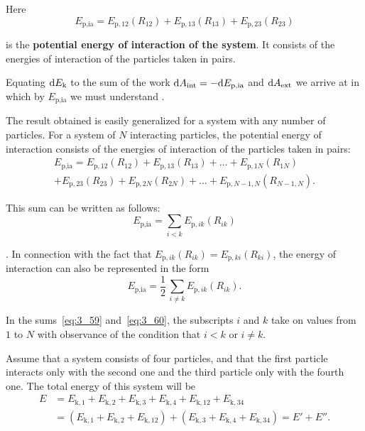 \noindent
Here
\begin{equation}\label{eq:3_57}
E_{\text{p,ia}} = E_{\text{p},12}(R_{12}) + E_{\text{p},13}(R_{13}) + E_{\text{p},23}(R_{23})
\end{equation}

\noindent
is the \textbf{potential energy of interaction of the system}. It consists of the energies of interaction of the particles taken in pairs.

Equating $\mathrm{d} E_{\text{k}}$ to the sum of the work $\mathrm{d} A_{\text{int}}=-\mathrm{d} E_{\text{p,ia}}$ and $\mathrm{d} A_{\text{ext}}$ we arrive at  in which by $E_{\text{p,ia}}$ we must understand .

The result obtained is easily generalized for a system with any number of particles. For a system of $N$ interacting particles, the potential energy of interaction consists of the energies of interaction of the particles taken in pairs:
\begin{multline}\label{eq:3_58}
E_{\text{p,ia}} = E_{\text{p},12}(R_{12}) + E_{\text{p},13}(R_{13}) + \ldots + E_{\text{p},1N}(R_{1N})\\
+ E_{\text{p},23}(R_{23}) + E_{\text{p},2N}(R_{2N}) + \ldots + E_{\text{p},N-1,N}(R_{N-1,N}).
\end{multline}

\noindent
This sum can be written as follows:
\begin{equation}\label{eq:3_59}
E_{\text{p,ia}} = \sum_{i<k} E_{\text{p},ik}(R_{ik})
\end{equation}

. In connection with the fact that $E_{\text{p},ik}(R_{ik})=E_{\text{p},ki}(R_{ki})$, the energy of interaction can also be represented in the form
\begin{equation}\label{eq:3_60}
E_{\text{p,ia}} = \frac{1}{2}\,\sum_{i\neq k} E_{\text{p},ik}(R_{ik}).
\end{equation}

\noindent
In the sums~\eqref{eq:3_59} and~\eqref{eq:3_60}, the subscripts $i$ and $k$ take on values from $1$ to $N$ with observance of the condition that $i<k$ or $i\neq k$.

Assume that a system consists of four particles, and that the first particle interacts only with the second one and the third particle only with the fourth one. The total energy of this system will be
\begin{align}
E &= E_{\text{k},1} + E_{\text{k},2} + E_{\text{k},3} + E_{\text{k},4} + E_{\text{k},12} + E_{\text{k},34}\nonumber\\
&= (E_{\text{k},1} + E_{\text{k},2} + E_{\text{k},12}) + (E_{\text{k},3} + E_{\text{k},4} + E_{\text{k},34}) = E' + E''. \label{eq:3_61}
\end{align}

